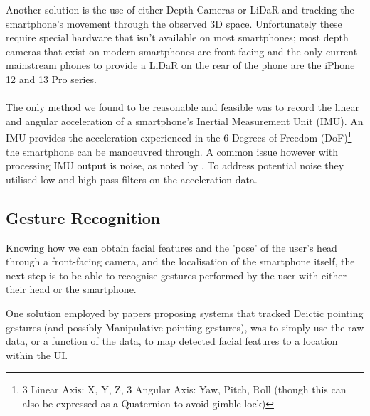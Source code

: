 Another solution is the use of either Depth-Cameras or LiDaR and tracking the smartphone's movement through the observed 3D space.
Unfortunately these require special hardware that isn't available on most smartphones; most depth cameras that exist on modern smartphones are front-facing and the only current mainstream phones to provide a LiDaR on the rear of the phone are the iPhone 12 and 13 Pro series.
\\\\
The only method we found to be reasonable and feasible was to record the linear and angular acceleration of a smartphone's Inertial Measurement Unit (IMU)\cite{mantyla2000hand, kratz2013combining, neelasagar2015real, garcia2014contextualized}. 
An IMU provides the acceleration experienced in the 6 Degrees of Freedom (DoF)\footnote{3 Linear Axis: X, Y, Z, 3 Angular Axis: Yaw, Pitch, Roll (though this can also be expressed as a Quaternion to avoid gimble lock)} the smartphone can be manoeuvred through.
A common issue however with processing IMU output is noise, as noted by \citeauthor{neelasagar2015real}. To address potential noise they utilised low and high pass filters on the acceleration data. 

\subsection{Gesture Recognition}
Knowing how we can obtain facial features and the 'pose' of the user's head through a front-facing camera, and the localisation of the smartphone itself, the next step is to be able to recognise gestures performed by the user with either their head or the smartphone.

One solution employed by papers proposing systems that tracked Deictic pointing gestures (and possibly Manipulative pointing gestures), was to simply use the raw data, or a function of the data, to map detected facial features to a location within the UI.

